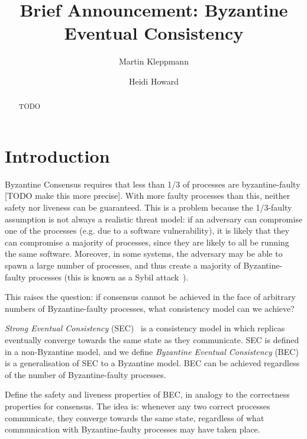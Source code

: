 \documentclass[manuscript]{acmart}
\begin{document}
\title{Brief Announcement: Byzantine Eventual Consistency}
\author{Martin Kleppmann}

\author{Heidi Howard}

\begin{abstract}
    TODO
\end{abstract}
\maketitle

\section{Introduction}

Byzantine Consensus requires that less than 1/3 of processes are byzantine-faulty [TODO make this more precise].
With more faulty processes than this, neither safety nor liveness can be guaranteed.
This is a problem because the 1/3-faulty assumption is not always a realistic threat model: if an adversary can compromise one of the processes (e.g. due to a software vulnerability), it is likely that they can compromise a majority of processes, since they are likely to all be running the same software.
Moreover, in some systems, the adversary may be able to spawn a large number of processes, and thus create a majority of Byzantine-faulty processes (this is known as a Sybil attack~\cite{Douceur:2002jr}).

This raises the question: if consensus cannot be achieved in the face of arbitrary numbers of Byzantine-faulty processes, what consistency model can we achieve?

\emph{Strong Eventual Consistency} (SEC)~\cite{Shapiro:2011un} is a consistency model in which replicas eventually converge towards the same state as they communicate.
SEC is defined in a non-Byzantine model, and we define \emph{Byzantine Eventual Consistency} (BEC) is a generalisation of SEC to a Byzantine model.
BEC can be achieved regardless of the number of Byzantine-faulty processes.

Define the safety and liveness properties of BEC, in analogy to the correctness properties for consensus.
The idea is: whenever any two correct processes communicate, they converge towards the same state, regardless of what communication with Byzantine-faulty processes may have taken place.
\end{document}
